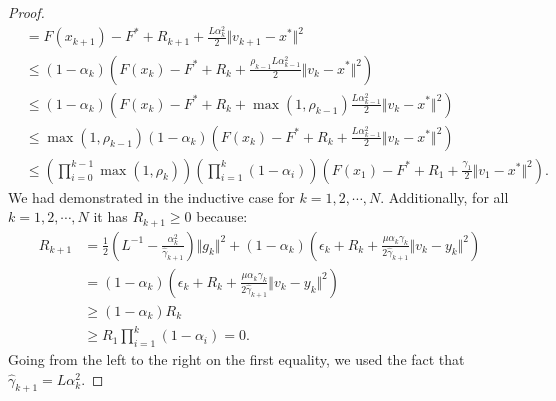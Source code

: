 \documentclass[12pt]{article}
\begin{document}
\begin{proof}
{\begin{align*}
            &=
            F(x_{k + 1}) - F^* + R_{k + 1} + \frac{L \alpha_k^2}{2}\Vert v_{k + 1} - x^*\Vert^2
            \\
            &\le 
            (1 - \alpha_k)
            \left(
                F(x_k) - F^* + R_k + \frac{\rho_{k - 1}L \alpha_{k - 1}^2}{2}\Vert v_k - x^*\Vert^2
            \right)
            \\
            &\le 
            (1 - \alpha_k)
            \left(
                F(x_k) - F^* + R_k + \max(1, \rho_{k - 1})\frac{L \alpha_{k - 1}^2}{2}\Vert v_k - x^*\Vert^2
            \right)
            \\
            &\le 
            \max(1, \rho_{k - 1})(1 - \alpha_k)
            \left(
                F(x_k) - F^* + R_k + \frac{L \alpha_{k - 1}^2}{2}\Vert v_k - x^*\Vert^2
            \right)
            \\
            &\le 
            \left(
                \prod_{i = 0}^{k - 1} \max(1, \rho_{k})
            \right)
            \left(
                \prod_{i = 1}^{k} \left(1  - \alpha_i\right)
            \right)
            \left(
                F(x_1) - F^* + R_1 + \frac{\gamma_1}{2}\Vert v_1 - x^*\Vert^2
            \right). 
        \end{align*}
        }
        We had demonstrated in the inductive case for $k=1, 2, \cdots, N$. 
        Additionally, for all $k = 1, 2, \cdots, N$ it has $R_{k + 1} \ge 0$ because: 
        \begin{align*}
            R_{k + 1}
            &= 
            \frac{1}{2}\left(
                L^{-1} - \frac{\alpha_k^2}{\hat \gamma_{k + 1}}
            \right)\Vert g_k\Vert^2
            + 
            (1 - \alpha_k)
            \left(
                \epsilon_k + R_k + 
                \frac{\mu\alpha_k\gamma_k}{2\hat \gamma_{k + 1}}
                \Vert v_k - y_k\Vert^2
            \right)
            \\
            &= (1 - \alpha_k)
            \left(
                \epsilon_k + R_k 
                + \frac{\mu\alpha_k\gamma_k}{2\hat \gamma_{k + 1}}
                \Vert v_k - y_k\Vert^2
            \right)
            \\
            &\ge 
            (1 - \alpha_k) R_k
            \\
            &\ge R_1 \prod_{i = 1}^{k} \left(1 - \alpha_i\right) = 0. 
        \end{align*}
        Going from the left to the right on the first equality, we used the fact that $\hat \gamma_{k + 1} = L \alpha_{k}^2$.

\end{proof}
\end{document}
